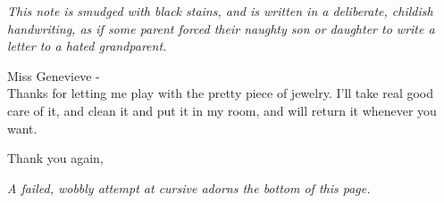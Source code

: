\documentclass[white]{airship}
\begin{document}
\name{\wNoteFromRobotToNPCWhore{}} %

{\it This note is smudged with black stains, and is written in a deliberate, childish handwriting, as if some parent forced their naughty son or daughter to write a letter to a hated grandparent.}

{\bf

Miss Genevieve - 
\\
Thanks for letting me play with the pretty piece of jewelry. I'll take real good care of it, and clean it and put it in my room, and will return it whenever you want.

Thank you again,

\cRobot{\MYname{}}}

{\it A failed, wobbly attempt at cursive adorns the bottom of this page.}
\end{document}
